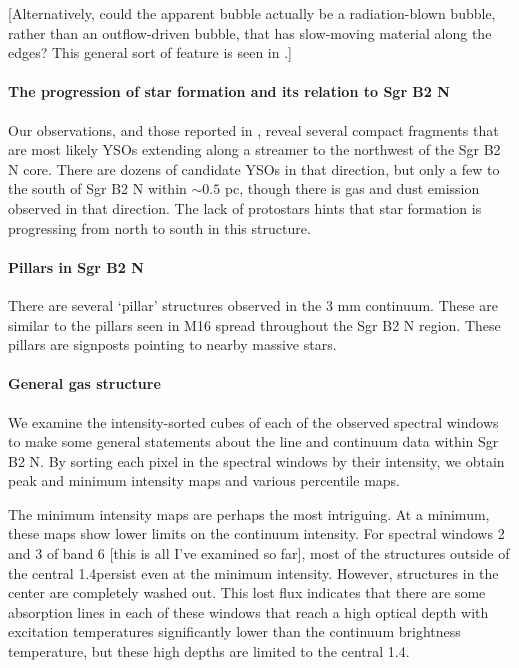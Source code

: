 \documentclass[twocolumn]{aastex61}
\begin{document}
[Alternatively, could the apparent bubble actually be a radiation-blown bubble, rather
than an outflow-driven bubble, that has slow-moving material along the edges?
This general sort of feature is seen in \citet{Rosen2016a}.]


\paragraph{The progression of star formation and its relation to Sgr B2 N}
Our observations, and those reported in \citet{Ginsburg2018a}, reveal several
compact fragments that are most likely YSOs extending along a streamer to the
northwest of the Sgr B2 N core.  There are dozens of candidate YSOs in that
direction, but only a few to the south of Sgr B2 N within $\sim0.5$ pc, though
there is gas and dust emission observed in that direction.  The lack of protostars
hints that star formation is progressing from north to south in this structure.

\paragraph{Pillars in Sgr B2 N}
There are several `pillar' structures observed in the 3 mm continuum.  These
are similar to the pillars seen in M16 spread throughout the Sgr B2 N region.
These pillars are signposts pointing to nearby massive stars.

\paragraph{General gas structure}
We examine the intensity-sorted cubes of each of the observed spectral windows
to make some general statements about the line and continuum data within 
Sgr B2 N.  By sorting each pixel in the spectral windows by their intensity,
we obtain peak and minimum intensity maps and various percentile maps.

The minimum intensity maps are perhaps the most intriguing.  At a minimum,
these maps show lower limits on the continuum intensity.  For spectral windows
2 and 3 of band 6 [this is all I've examined so far], most of the structures
outside of the central 1.4\arcsec persist even at the minimum intensity.
However, structures in the center are completely washed out.  This lost flux
indicates that there are some absorption lines in each of these windows that
reach a high optical depth with excitation temperatures significantly lower
than the continuum brightness temperature, but these high depths are limited to
the central 1.4\arcsec.
\end{document}
